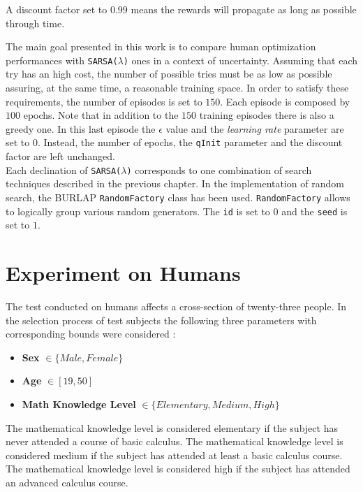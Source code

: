 A discount factor set to $0.99$ means the rewards will propagate as long as possible through time.

The main goal presented in this work is to compare human optimization performances with {\tt SARSA($\lambda$)} ones in a context of uncertainty. Assuming that each try has an high cost, the number of possible tries must be as low as possible assuring, at the same time, a reasonable training space. In order to satisfy these requirements, the number of episodes is set to $150$. Each episode is composed by $100$ epochs. Note that in addition to the $150$ training episodes there is also a greedy one. In this last episode the $\epsilon$ value and the \textit{learning rate} parameter are set to $0$. Instead, the number of epochs, the {\tt qInit} parameter and the discount factor are left unchanged.  \\

Each declination of {\tt SARSA(\textit{$\lambda$})} corresponds to one combination of search techniques described in the previous chapter. In the implementation of random search, the BURLAP {\tt RandomFactory} class has been used. {\tt RandomFactory} allows to logically group various random generators. The {\tt id} is set to $0$ and the {\tt seed} is set to $1$.

\section{Experiment on Humans}

The test conducted on humans affects a cross-section of twenty-three people. In the selection process of test subjects the following three parameters with corresponding bounds were considered :

\begin{itemize}
	\item \textbf{Sex} $\in \{Male, Female\}$
	\item \textbf{Age} $\in [19, 50]$
	\item \textbf{Math Knowledge Level} $\in \{Elementary, Medium, High\}$ 
\end{itemize} 

The mathematical knowledge level is considered elementary if the subject has never attended a course of basic calculus. The mathematical knowledge level is considered medium if the subject has attended at least a basic calculus course. The mathematical knowledge level is considered high if the subject has attended an advanced calculus course. \\

